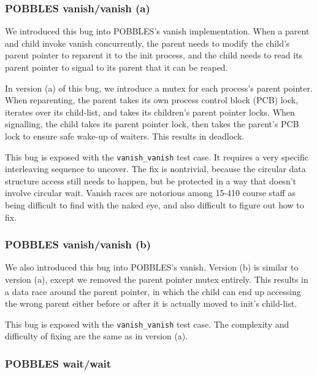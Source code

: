 \subsubsection{POBBLES vanish/vanish (a)}

We introduced this bug into POBBLES's vanish implementation. When a parent and child invoke vanish concurrently, the parent needs to modify the child's parent pointer to reparent it to the init process, and the child needs to read its parent pointer to signal to its parent that it can be reaped.

In version (a) of this bug, we introduce a mutex for each process's parent pointer. When reparenting, the parent takes its own process control block (PCB) lock, iterates over its child-list, and takes its children's parent pointer locks. When signalling, the child takes its parent pointer lock, then takes the parent's PCB lock to ensure safe wake-up of waiters. This results in deadlock.

This bug is exposed with the \texttt{vanish\_vanish} test case. It requires a very specific interleaving sequence to uncover.
The fix is nontrivial, because the circular data structure access still needs to happen, but be protected in a way that doesn't involve circular wait.
Vanish races are notorious among 15-410 course staff as being difficult to find with the naked eye, and also difficult to figure out how to fix.

\subsubsection{POBBLES vanish/vanish (b)}

We also introduced this bug into POBBLES's vanish. Version (b) is similar to version (a), except we removed the parent pointer mutex entirely. This results in a data race around the parent pointer, in which the child can end up accessing the wrong parent either before or after it is actually moved to init's child-list.

This bug is exposed with the \texttt{vanish\_vanish} test case. The complexity and difficulty of fixing are the same as in version (a).

\subsubsection{POBBLES wait/wait}

